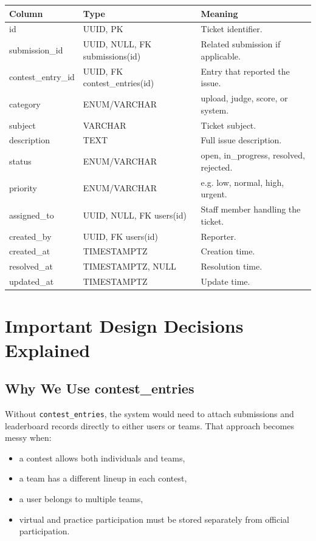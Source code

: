 \documentclass[11pt,a4paper]{article}
\begin{document}
\begin{longtable}{>{\raggedright\arraybackslash}p{} >{\raggedright\arraybackslash}p{} >{\raggedright\arraybackslash}p{}}
\toprule
\textbf{Column} & \textbf{Type} & \textbf{Meaning} \\
\midrule
id & UUID, PK & Ticket identifier. \\
submission\_id & UUID, NULL, FK submissions(id) & Related submission if applicable. \\
contest\_entry\_id & UUID, FK contest\_entries(id) & Entry that reported the issue. \\
category & ENUM/VARCHAR & upload, judge, score, or system. \\
subject & VARCHAR & Ticket subject. \\
description & TEXT & Full issue description. \\
status & ENUM/VARCHAR & open, in\_progress, resolved, rejected. \\
priority & ENUM/VARCHAR & e.g. low, normal, high, urgent. \\
assigned\_to & UUID, NULL, FK users(id) & Staff member handling the ticket. \\
created\_by & UUID, FK users(id) & Reporter. \\
created\_at & TIMESTAMPTZ & Creation time. \\
resolved\_at & TIMESTAMPTZ, NULL & Resolution time. \\
updated\_at & TIMESTAMPTZ & Update time. \\
\bottomrule
\end{longtable}

\section{Important Design Decisions Explained}

\subsection{Why We Use contest\_entries}
Without \texttt{contest\_entries}, the system would need to attach submissions and leaderboard records directly to either users or teams. That approach becomes messy when:
\begin{itemize}
    \item a contest allows both individuals and teams,
    \item a team has a different lineup in each contest,
    \item a user belongs to multiple teams,
    \item virtual and practice participation must be stored separately from official participation.
\end{itemize}
\end{document}
